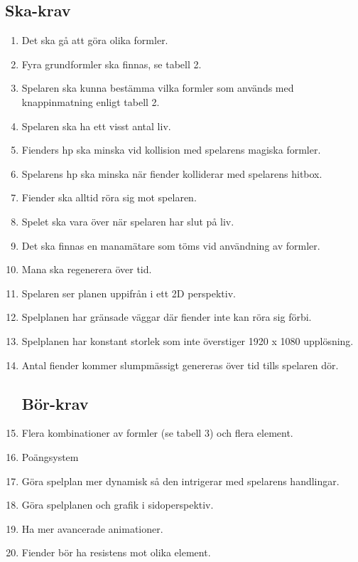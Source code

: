 \documentclass[12pt]{TDP005mall}
\begin{document}
\subsection{Ska-krav}
\begin{enumerate}
\item Det ska gå att göra olika formler.
\item Fyra grundformler ska finnas, se tabell 2.
\item Spelaren ska kunna bestämma vilka formler som används med knappinmatning enligt tabell 2.
\item Spelaren ska ha ett visst antal liv.
\item Fienders hp ska minska vid kollision med spelarens magiska formler.
\item Spelarens hp ska minska när fiender kolliderar med spelarens hitbox.
\item Fiender ska alltid röra sig mot spelaren.
\item Spelet ska vara över när spelaren har slut på liv.
\item Det ska finnas en manamätare som töms vid användning av formler.
\item Mana ska regenerera över tid.
\item Spelaren ser planen uppifrån i ett 2D perspektiv. 
\item Spelplanen har gränsade väggar där fiender inte kan röra sig förbi.
\item Spelplanen har konstant storlek som inte överstiger 1920 x 1080 upplösning.
\item Antal fiender kommer slumpmässigt genereras över tid tills spelaren dör.

\clearpage

\subsection{Bör-krav}
\item Flera kombinationer av formler (se tabell 3) och flera element.
\item Poängsystem
\item Göra spelplan mer dynamisk så den intrigerar med spelarens handlingar.
\item Göra spelplanen och grafik i sidoperspektiv. 
\item Ha mer avancerade animationer.
\item Fiender bör ha resistens mot olika element.
\end{enumerate}
\end{document}
